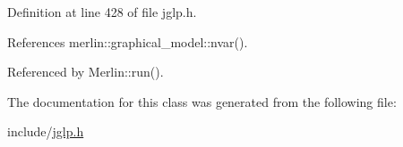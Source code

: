 Definition at line 428 of file jglp.\+h.



References merlin\+::graphical\+\_\+model\+::nvar().



Referenced by Merlin\+::run().



The documentation for this class was generated from the following file\+:\begin{DoxyCompactItemize}
\item 
include/\hyperlink{jglp_8h}{jglp.\+h}\end{DoxyCompactItemize}
